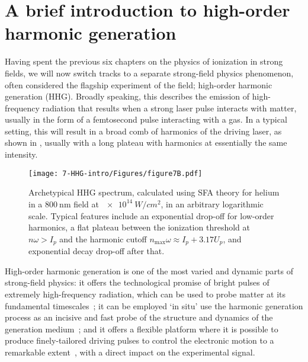 





\chapter{A brief introduction to high-order harmonic generation}
\label{chap:HHG-intro}

Having spent the previous six chapters on the physics of ionization in strong fields, we will now switch tracks to a separate strong-field physics phenomenon, often considered the flagship experiment of the field; high-order harmonic generation (HHG). Broadly speaking, this describes the emission of high-frequency radiation that results when a strong laser pulse interacts with matter, usually in the form of a femtosecond pulse interacting with a gas. In a typical setting, this will result in a broad comb of harmonics of the driving laser, as shown in , usually with a long plateau with harmonics at essentially the same intensity.

\begin{figure}[htb]
  \centering
  \texttt{[image: 7-HHG-intro/Figures/figure7B.pdf]}
  \caption[
  Archetypical HHG spectrum
  ]{
  Archetypical HHG spectrum, calculated using SFA theory for helium in a $\SI{800}{\nano\meter}$ field at $\SI{e14}{W/cm^2}$, in an arbitrary logarithmic scale. Typical features include an exponential drop-off for low-order harmonics, a flat plateau between the ionization threshold at $n\omega>I_p$ and the harmonic cutoff $n_\mathrm{max}\omega\approx I_p+3.17U_p$, and exponential decay drop-off after that.
  }
\label{f7-standard-harmonic-spectrum}
\end{figure}



High-order harmonic generation is one of the most varied and dynamic parts of strong-field physics: it offers the technological promise of bright pulses of extremely high-fre\-quen\-cy radiation, which can be used to probe matter at its fundamental timescales~\cite{popmintchev_record_2012, calegari_phenylalanine_2014}; it can be employed `in situ' use the harmonic generation process as an incisive and fast probe of the structure and dynamics of the generation medium~\cite{mairesse_high-harmonic-spectroscopy_2010}; and it offers a flexible platform where it is possible to produce finely-tailored driving pulses to control the electronic motion to a remarkable extent~\cite{ chipperfield_ideal_2009, brugnera_hhg-orthogonal_2011}, with a direct impact on the experimental signal.


